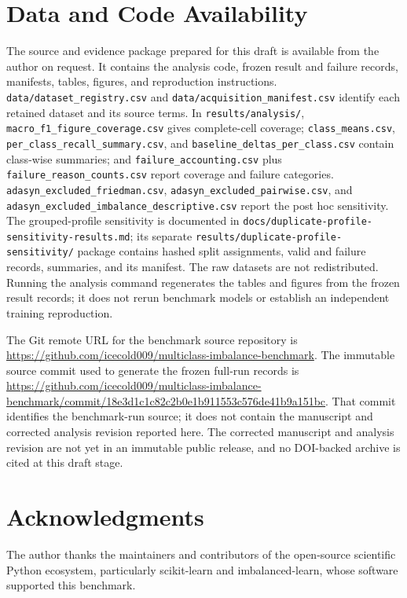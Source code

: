 \documentclass[10pt]{article}
\begin{document}
\section{Data and Code Availability}

The source and evidence package prepared for this draft is available from the author on request. It contains the analysis code, frozen result and failure records, manifests, tables, figures, and reproduction instructions. \texttt{data/dataset\_registry.csv} and \texttt{data/acquisition\_manifest.csv} identify each retained dataset and its source terms. In \texttt{results/analysis/}, \texttt{macro\_f1\_figure\_coverage.csv} gives complete-cell coverage; \texttt{class\_means.csv}, \texttt{per\_class\_recall\_summary.csv}, and \texttt{baseline\_deltas\_per\_class.csv} contain class-wise summaries; and \texttt{failure\_accounting.csv} plus \texttt{failure\_reason\_counts.csv} report coverage and failure categories. \texttt{adasyn\_excluded\_friedman.csv}, \texttt{adasyn\_excluded\_pairwise.csv}, and \texttt{adasyn\_excluded\_imbalance\_descriptive.csv} report the post hoc sensitivity. The grouped-profile sensitivity is documented in \texttt{docs/duplicate-profile-sensitivity-results.md}; its separate \texttt{results/duplicate-profile-sensitivity/} package contains hashed split assignments, valid and failure records, summaries, and its manifest. The raw datasets are not redistributed. Running the analysis command regenerates the tables and figures from the frozen result records; it does not rerun benchmark models or establish an independent training reproduction.

The Git remote URL for the benchmark source repository is \url{https://github.com/icecold009/multiclass-imbalance-benchmark}. The immutable source commit used to generate the frozen full-run records is \url{https://github.com/icecold009/multiclass-imbalance-benchmark/commit/18e3d1c1c82c2b0e1b911553c576de41b9a151bc}. That commit identifies the benchmark-run source; it does not contain the manuscript and corrected analysis revision reported here. The corrected manuscript and analysis revision are not yet in an immutable public release, and no DOI-backed archive is cited at this draft stage.

\section*{Acknowledgments}

The author thanks the maintainers and contributors of the open-source
scientific Python ecosystem, particularly scikit-learn and imbalanced-learn,
whose software supported this benchmark.



\end{document}
